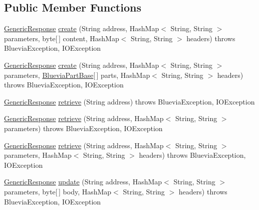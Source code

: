\subsection*{Public Member Functions}
\begin{DoxyCompactItemize}
\item 
\hyperlink{classcom_1_1bluevia_1_1commons_1_1connector_1_1GenericResponse}{GenericResponse} \hyperlink{interfacecom_1_1bluevia_1_1commons_1_1connector_1_1IConnector_a69caf7d9808244faa2996b7e2d23b306}{create} (String address, HashMap$<$ String, String $>$ parameters, byte\mbox{[}$\,$\mbox{]} content, HashMap$<$ String, String $>$ headers)  throws BlueviaException, IOException
\item 
\hyperlink{classcom_1_1bluevia_1_1commons_1_1connector_1_1GenericResponse}{GenericResponse} \hyperlink{interfacecom_1_1bluevia_1_1commons_1_1connector_1_1IConnector_a4340bf82569b7bc27785452df03c38f3}{create} (String address, HashMap$<$ String, String $>$ parameters, \hyperlink{classcom_1_1bluevia_1_1commons_1_1connector_1_1http_1_1multipart_1_1BlueviaPartBase}{BlueviaPartBase}\mbox{[}$\,$\mbox{]} parts, HashMap$<$ String, String $>$ headers)  throws BlueviaException, IOException
\item 
\hyperlink{classcom_1_1bluevia_1_1commons_1_1connector_1_1GenericResponse}{GenericResponse} \hyperlink{interfacecom_1_1bluevia_1_1commons_1_1connector_1_1IConnector_abc00fc6740197ca7ffe1943842dd3507}{retrieve} (String address)  throws BlueviaException, IOException
\item 
\hyperlink{classcom_1_1bluevia_1_1commons_1_1connector_1_1GenericResponse}{GenericResponse} \hyperlink{interfacecom_1_1bluevia_1_1commons_1_1connector_1_1IConnector_adf31a6c7c534fcd1d9f629bc9b6b2a90}{retrieve} (String address, HashMap$<$ String, String $>$ parameters)  throws BlueviaException, IOException
\item 
\hyperlink{classcom_1_1bluevia_1_1commons_1_1connector_1_1GenericResponse}{GenericResponse} \hyperlink{interfacecom_1_1bluevia_1_1commons_1_1connector_1_1IConnector_ab1b1dbc83b44b3db70ce0a2ccee1e471}{retrieve} (String address, HashMap$<$ String, String $>$ parameters, HashMap$<$ String, String $>$ headers)  throws BlueviaException, IOException
\item 
\hyperlink{classcom_1_1bluevia_1_1commons_1_1connector_1_1GenericResponse}{GenericResponse} \hyperlink{interfacecom_1_1bluevia_1_1commons_1_1connector_1_1IConnector_aa637a55439fe2d98df37a98608da31d4}{update} (String address, HashMap$<$ String, String $>$ parameters, byte\mbox{[}$\,$\mbox{]} body, HashMap$<$ String, String $>$ headers)  throws BlueviaException, IOException

\end{DoxyCompactItemize}
